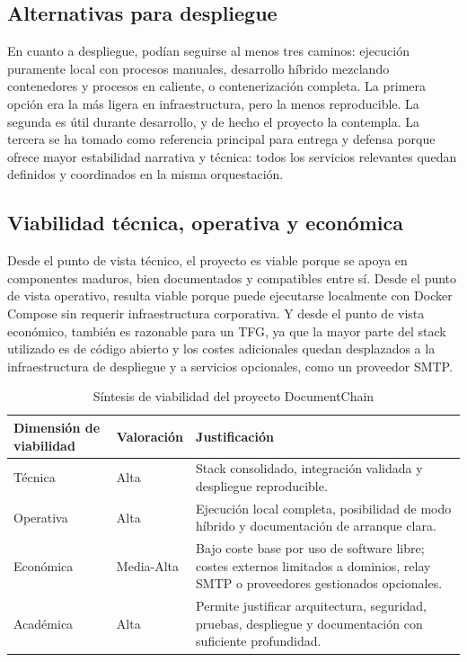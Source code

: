 \documentclass[11pt, a4paper]{article}
\begin{document}
\subsection{Alternativas para despliegue}

En cuanto a despliegue, podían seguirse al menos tres caminos: ejecución puramente local con procesos manuales, desarrollo híbrido mezclando contenedores y procesos en caliente, o contenerización completa. La primera opción era la más ligera en infraestructura, pero la menos reproducible. La segunda es útil durante desarrollo, y de hecho el proyecto la contempla. La tercera se ha tomado como referencia principal para entrega y defensa porque ofrece mayor estabilidad narrativa y técnica: todos los servicios relevantes quedan definidos y coordinados en la misma orquestación.

\subsection{Viabilidad técnica, operativa y económica}

Desde el punto de vista técnico, el proyecto es viable porque se apoya en componentes maduros, bien documentados y compatibles entre sí. Desde el punto de vista operativo, resulta viable porque puede ejecutarse localmente con Docker Compose sin requerir infraestructura corporativa. Y desde el punto de vista económico, también es razonable para un TFG, ya que la mayor parte del stack utilizado es de código abierto y los costes adicionales quedan desplazados a la infraestructura de despliegue y a servicios opcionales, como un proveedor SMTP.

\begin{table}[H]
    \centering
    \small
    \begin{tabular}{|p{3.5cm}|p{2.2cm}|p{6.7cm}|}
    \hline
    \textbf{Dimensión de viabilidad} & \textbf{Valoración} & \textbf{Justificación} \\
    \hline
    Técnica & Alta & Stack consolidado, integración validada y despliegue reproducible. \\
    \hline
    Operativa & Alta & Ejecución local completa, posibilidad de modo híbrido y documentación de arranque clara. \\
    \hline
    Económica & Media-Alta & Bajo coste base por uso de software libre; costes externos limitados a dominios, relay SMTP o proveedores gestionados opcionales. \\
    \hline
    Académica & Alta & Permite justificar arquitectura, seguridad, pruebas, despliegue y documentación con suficiente profundidad. \\
    \hline
    \end{tabular}
    \caption{Síntesis de viabilidad del proyecto DocumentChain}
    \label{tab:viabilidad-proyecto}
\end{table}
\end{document}
